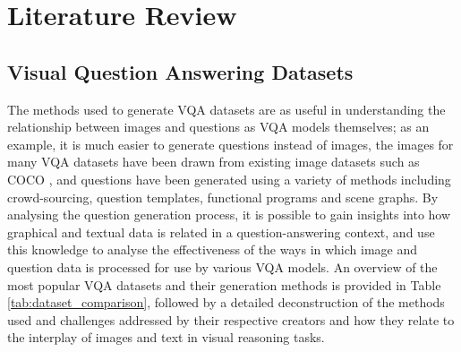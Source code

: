 \chapter{Literature Review}



\section{Visual Question Answering Datasets}

The methods used to generate VQA datasets are as useful in understanding the relationship between images and questions as VQA models themselves; as an example, it is much easier to generate questions instead of images, the images for many VQA datasets have been drawn from existing image datasets such as COCO \cite{lin2014microsoft}, and questions have been generated using a variety of methods including crowd-sourcing, question templates, functional programs and scene graphs. By analysing the question generation process, it is possible to gain insights into how graphical and textual data is related in a question-answering context, and use this knowledge to analyse the effectiveness of the ways in which image and question data is processed for use by various VQA models. An overview of the most popular VQA datasets and their generation methods is provided in Table \ref{tab:dataset_comparison}, followed by a detailed deconstruction of the methods used and challenges addressed by their respective creators and how they relate to the interplay of images and text in visual reasoning tasks.


